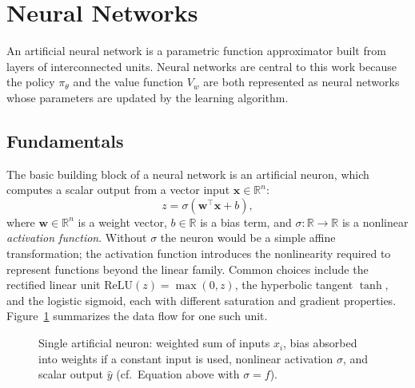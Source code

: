 
\section{Neural Networks}

An artificial neural network is a parametric function approximator built from
layers of interconnected units.  Neural networks are central to this work
because the policy $\pi_\theta$ and the value function $V_w$ are both
represented as neural networks whose parameters are updated by the learning
algorithm.

\subsection{Fundamentals}

The basic building block of a neural network is an artificial neuron, which
computes a scalar output from a vector input $\mathbf{x} \in \mathbb{R}^n$:
%
\begin{equation}
    z = \sigma\!\left(\mathbf{w}^\top \mathbf{x} + b\right),
\end{equation}
%
where $\mathbf{w} \in \mathbb{R}^n$ is a weight vector, $b \in \mathbb{R}$ is
a bias term, and $\sigma : \mathbb{R} \to \mathbb{R}$ is a nonlinear
\emph{activation function}.  Without $\sigma$ the neuron would be a simple
affine transformation; the activation function introduces the nonlinearity
required to represent functions beyond the linear family.  Common choices
include the rectified linear unit $\text{ReLU}(z) = \max(0, z)$, the
hyperbolic tangent $\tanh$, and the logistic sigmoid, each with different
saturation and gradient properties.
Figure~\ref{fig:perceptron} summarizes the data flow for one such unit.

\begin{figure}[ht]
    \centering
    \resizebox{0.75\linewidth}{!}{%
    }
    \caption{Single artificial neuron: weighted sum of inputs $x_i$, bias absorbed
    into weights if a constant input is used, nonlinear activation $\sigma$,
    and scalar output $\hat{y}$ (cf.\ Equation above with $\sigma = f$).}
    \label{fig:perceptron}
\end{figure}


